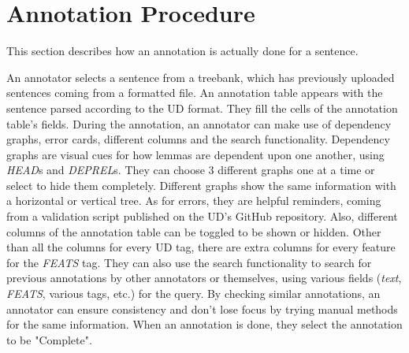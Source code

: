 \section{Annotation Procedure}
\label{sec:annotation}
This section describes how an annotation is actually done for a sentence.

An annotator selects a sentence from a treebank, which has previously uploaded sentences coming from a \conllu{} formatted file.
An annotation table appears with the sentence parsed according to the UD format.
They fill the cells of the annotation table's fields.
During the annotation, an annotator can make use of dependency graphs, error cards, different columns and the search functionality.
Dependency graphs are visual cues for how lemmas are dependent upon one another, using \textit{HEAD}s and \textit{DEPREL}s.
They can choose 3 different graphs one at a time or select to hide them completely.
Different graphs show the same information with a horizontal or vertical tree.
As for errors, they are helpful reminders, coming from a validation script published on the UD's GitHub repository.
Also, different columns of the annotation table can be toggled to be shown or hidden.
Other than all the columns for every UD tag, there are extra columns for every feature for the \textit{FEATS} tag.
They can also use the search functionality to search for previous annotations by other annotators or themselves, using various fields (\textit{text}, \textit{FEATS}, various tags, etc.) for the query.
By checking similar annotations, an annotator can ensure consistency and don't lose focus by trying manual methods for the same information.
When an annotation is done, they select the annotation to be "Complete".

